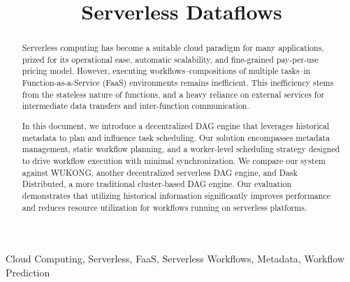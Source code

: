 \documentclass[conference]{IEEEtran}
\begin{document}
\title{Serverless Dataflows}

\author{
\and
{}
}
\maketitle

\begin{abstract}
Serverless computing has become a suitable cloud paradigm for many applications, prized for its operational ease, automatic scalability, and fine-grained pay-per-use pricing model. However, executing workflows--compositions of multiple tasks--in Function-as-a-Service (FaaS) environments remains inefficient. This inefficiency stems from the stateless nature of functions, and a heavy reliance on external services for intermediate data transfers and inter-function communication.

In this document, we introduce a decentralized DAG engine that leverages historical metadata to plan and influence task scheduling. Our solution encompasses metadata management, static workflow planning, and a worker-level scheduling strategy designed to drive workflow execution with minimal synchronization. We compare our system against WUKONG, another decentralized serverless DAG engine, and Dask Distributed, a more traditional cluster-based DAG engine. Our evaluation demonstrates that utilizing historical information significantly improves performance and reduces resource utilization for workflows running on serverless platforms.
\end{abstract}

\begin{IEEEkeywords}
Cloud Computing, Serverless, FaaS, Serverless Workflows, Metadata, Workflow Prediction
\end{IEEEkeywords}
\end{document}
